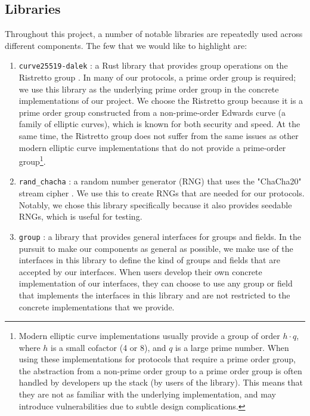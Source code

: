 \subsection{Libraries}\label{sec:libraries}
Throughout this project, a number of notable libraries are repeatedly 
used across different components. The few that we would like to highlight 
are:
\begin{enumerate}
  \item \texttt{curve25519-dalek} \cite{curve25519-dalek}: a Rust library that 
  provides group operations on the Ristretto group \cite{ristretto_web}. In many 
  of our protocols, a prime order group is required; we use this library as 
  the underlying prime order group in the concrete implementations of 
  our project. We choose the Ristretto group because it is a prime order 
  group constructed from a non-prime-order Edwards curve \cite{Edwards2007}
  (a family of elliptic curves), which is known for both security and speed. 
  At the same time, the Ristretto group does not suffer from the same issues as 
  other modern elliptic curve implementations that do not provide a prime-order group\footnote{
    Modern elliptic curve implementations usually provide a group of order $h \cdot q$, where 
    $h$ is a small cofactor (4 or 8), and $q$ is a large prime number. When using these 
    implementations for protocols that require a prime order group, the abstraction from 
    a non-prime order group to a prime order group is often handled by developers up the stack 
    (by users of the library). This means that they are not as familiar with the underlying 
      implementation, and may introduce vulnerabilities due to subtle design complications.
  }. 
  
  \item \texttt{rand\_chacha} \cite{rand-chacha}: a random number generator (RNG) that uses the 
  "ChaCha20" stream cipher \cite{bernstein2008chacha}. We use this to create RNGs 
  that are needed for our protocols. Notably, we chose this library 
  specifically because it also provides seedable RNGs, 
  which is useful for testing. 
  \item \texttt{group} \cite{group}: a library that provides general interfaces for 
  groups and fields. In the pursuit to make our components as general as 
  possible, we make use of the interfaces in this library to define the 
  kind of groups and fields that are accepted by our interfaces. When users 
  develop their own concrete implementation of our interfaces, they can 
  choose to use any group or field that implements the interfaces in this 
  library and are not restricted to the concrete implementations that we 
  provide. 
\end{enumerate} 


